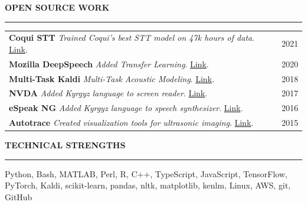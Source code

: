 \documentclass{cv} %
\begin{document}
\vspace{.5cm}
\sectionskip
\MakeUppercase{\textbf{Open Source Work}}
  \sectionlineskip
  \hrule
\vspace{.5cm}

\renewcommand{\arraystretch}{1.5} %
\begin{tabular}{@{}p{}p{}@{}}
  {\textbf{Coqui STT}} {\hfill \textit{Trained Coqui's best STT model on 47k hours of data}}.   \href{https://github.com/coqui-ai/STT/releases/tag/v1.0.0}{Link}.
  &
  \hfill 2021
  \\
  {\textbf{Mozilla DeepSpeech}} {\hfill \textit{Added Transfer Learning}}.  \href{https://github.com/mozilla/DeepSpeech/releases/tag/v0.7.0}{Link}.
  &
  \hfill 2020
  \\
  {\textbf{Multi-Task Kaldi}} {\hfill \textit{Multi-Task Acoustic Modeling}}.  \href{https://github.com/JRMeyer/multi-task-kaldi}{Link}.
  &
  \hfill 2018
  \\
  {\textbf{NVDA}} {\hfill \textit{Added Kyrgyz language to screen reader}}.  \href{https://github.com/JRMeyer/nvda}{Link}.
  &
  \hfill 2017
  \\
  {\textbf{eSpeak NG}} {\hfill \textit{Added Kyrgyz language to speech synthesizer}}.  \href{https://github.com/rhdunn/espeak/commits?author=JRMeyer}{Link}.
  &
  \hfill 2016
  \\
  {\textbf{Autotrace}} {\hfill \textit{Created visualization tools for ultrasonic imaging}}.  \href{https://github.com/JRMeyer/Autotrace}{Link}.
  &
  \hfill 2015
\end{tabular}










\vspace{.5cm}
\sectionskip
\MakeUppercase{\textbf{Technical Strengths}}
  \sectionlineskip
  \hrule
\vspace{.5cm}

Python, Bash, MATLAB, Perl, R, C++, TypeScript, JavaScript, TensorFlow, PyTorch, Kaldi, scikit-learn, pandas, nltk, matplotlib, kenlm, Linux, AWS, git, GitHub \\
\end{document}

